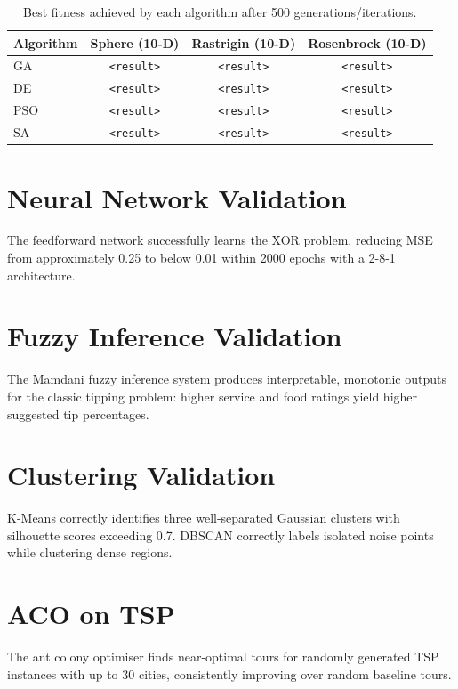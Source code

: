 \documentclass[12pt,a4paper,twoside]{report}
\begin{document}
\begin{table}[h]
  \centering
  \begin{tabular}{lccc}
    \toprule
    Algorithm & Sphere (10-D) & Rastrigin (10-D) & Rosenbrock (10-D) \\
    \midrule
    GA & \texttt{<result>} & \texttt{<result>} & \texttt{<result>} \\
    DE & \texttt{<result>} & \texttt{<result>} & \texttt{<result>} \\
    PSO & \texttt{<result>} & \texttt{<result>} & \texttt{<result>} \\
    SA & \texttt{<result>} & \texttt{<result>} & \texttt{<result>} \\
    \bottomrule
  \end{tabular}
  \caption{Best fitness achieved by each algorithm after 500 generations/iterations.}
  \label{tab:results}
\end{table}

\section{Neural Network Validation}
The feedforward network successfully learns the XOR problem, reducing MSE
from approximately 0.25 to below 0.01 within 2000 epochs with a 2-8-1
architecture.

\section{Fuzzy Inference Validation}
The Mamdani fuzzy inference system produces interpretable, monotonic
outputs for the classic tipping problem: higher service and food ratings
yield higher suggested tip percentages.

\section{Clustering Validation}
K-Means correctly identifies three well-separated Gaussian clusters with
silhouette scores exceeding 0.7. DBSCAN correctly labels isolated noise
points while clustering dense regions.

\section{ACO on TSP}
The ant colony optimiser finds near-optimal tours for randomly generated
TSP instances with up to 30 cities, consistently improving over random
baseline tours.
\end{document}
